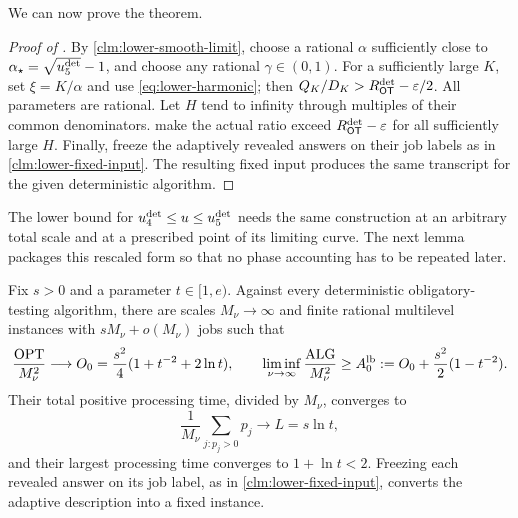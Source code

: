 We can now prove the theorem.

\begin{proof}[Proof of ]
By \cref{clm:lower-smooth-limit}, choose a rational $\alpha$ sufficiently close to
$\alpha_\star=\sqrt{u_{5}^{\mathrm{det}}}-1$, and choose any rational
$\gamma\in(0,1)$.  For a sufficiently large $K$, set $\xi=K/\alpha$ and use
\cref{eq:lower-harmonic}; then $Q_K/D_K>R_{\mathsf{OT}}^{\mathrm{det}}-\varepsilon/2$.
All parameters are rational.  Let $H$ tend to infinity through multiples of
their common denominators.
 make the actual ratio exceed
$R_{\mathsf{OT}}^{\mathrm{det}}-\varepsilon$ for all sufficiently large $H$.  Finally, freeze
the adaptively revealed answers on their job labels as in
\cref{clm:lower-fixed-input}.  The
resulting fixed input produces the same transcript for the given
deterministic algorithm.
\end{proof}

The lower bound for $u_{4}^{\mathrm{det}}\le u\le u_{5}^{\mathrm{det}}$ needs the same construction
at an arbitrary total scale and at a prescribed point of its limiting curve.
The next lemma packages this
rescaled form so that no phase accounting has to be repeated later.

\begin{lemma}
\label{lem:opt:harmonic-block}
Fix $s>0$ and a parameter $t\in[1,e)$.  Against
every deterministic obligatory-testing algorithm, there are scales
$M_\nu\to\infty$ and finite rational multilevel instances with
$sM_\nu+o(M_\nu)$ jobs such that
\begin{equation}
 \frac{\operatorname{OPT}}{M_\nu^2}\longrightarrow
 O_0=\frac{s^2}{4}(1+t^{-2}+2\ln t),
 \qquad
 \liminf_{\nu\to\infty}\frac{\operatorname{ALG}}{M_\nu^2}
 \ge A_0^{\rm lb}
 \mathrel{:=} O_0+\frac{s^2}{2}(1-t^{-2}).
 \label{eq:opt:harmonic-coefficients}
\end{equation}
Their total positive processing time, divided by $M_\nu$, converges to
\begin{equation}
 \frac1{M_\nu}\sum_{j:p_j>0}p_j\longrightarrow L=s\ln t,
 \label{eq:opt:harmonic-processing-mass}
\end{equation}
and their largest processing time converges to $1+\ln t<2$.
Freezing each revealed answer on its job label, as in
\cref{clm:lower-fixed-input}, converts the adaptive description into a fixed
instance.
\end{lemma}


